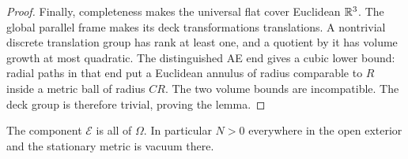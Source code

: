 \begin{proof}
Finally, completeness makes the universal flat cover Euclidean
\(\mathbb R^3\). The global parallel frame makes its deck transformations
translations. A nontrivial discrete translation group has rank
at least one, and a quotient by it has volume growth at most
quadratic. The distinguished AE end gives a cubic lower bound:
radial paths in that end put a Euclidean annulus of radius
comparable to \(R\) inside a metric ball of radius \(CR\).
The two volume bounds are incompatible.
The deck group is therefore trivial, proving the lemma.
\end{proof}

\begin{lemma}
\label{q3:static:no-internal-null}
The component \(\mathcal E\) is all of \(\Omega\).
In particular \(N>0\) everywhere in the open exterior and the
stationary metric is vacuum there.
\end{lemma}


